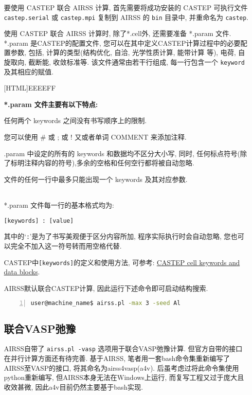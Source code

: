 \documentclass[a4paper, 10pt]{article}
\begin{document}
要使用 CASTEP 联合 AIRSS 计算, 首先需要将成功安装的 CASTEP 可执行文件 \verb|castep.serial| 或 \verb|castep.mpi| 复制到 AIRSS 的 \verb|bin| 目录中, 并重命名为 \verb|castep|.

使用 CASTEP 联合 AIRSS 计算时, 除了*.cell外, 还需要准备 *.param 文件. *.param 是CASTEP的配置文件, 您可以在其中定义CASTEP计算过程中的必要配置参数, 包括, 计算的类型(结构优化, 自洽, 光学性质计算, 能带计算 等), 电荷, 自旋取向, 截断能, 收敛标准等. 该文件通常由若干行组成, 每一行包含一个 \verb|keyword| 及其相应的赋值.

\noindent{}[HTML]{EEEEFF}{\parbox{\textwidth}{%
\noindent \textbf{*.param 文件主要有以下特点:}
\begin{maineu}
\item 任何两个 keywords 之间没有书写顺序上的限制.
\item 您可以使用 \# 或 ; 或 ! 又或者单词 COMMENT 来添加注释.
\item *.param 中设定的所有的 keywords 和数据均不区分大小写, 同时, 任何标点符号(除了标明注释内容的符号),多余的空格和任何空行都将被自动忽略.
\item 文件的任何一行中最多只能出现一个 keywords 及其对应参数.
\end{maineu}}}\\

*.param 文件每一行的基本格式均为:
\begin{lstlisting}
[keywords] : [value]
\end{lstlisting}
其中的`\verb|:|'是为了书写美观便于区分内容所加, 程序实际执行时会自动忽略, 您也可以完全不加入这一符号转而用空格代替.

CASTEP中\verb|[keywords]|的定义和使用方法, 可参考: \href{http://www.tcm.phy.cam.ac.uk/castep/documentation/WebHelp/content/modules/castep/keywords/k_main_structure.htm}{CASTEP cell keywords and data blocks}.

AIRSS默认联合CASTEP计算, 因此运行下述命令即可启动结构搜索.
\begin{lstlisting}[language={bash},numbers=left]
user@machine_name$ airss.pl -max 3 -seed Al
\end{lstlisting}

\subsection{联合VASP弛豫}
AIRSS自带了 \verb|airss.pl -vasp| 选项用于联合VASP弛豫计算. 但官方自带的接口在并行计算方面还有待完善. 基于AIRSS, 笔者用一套bash命令集重新编写了AIRSS至VASP的接口, 将其命名为airss4vasp(a4v). 后虽考虑过将此命令集使用python重新编写, 但AIRSS本身无法在Windows上运行, 而复写工程又过于庞大且收效甚微, 因此a4v目前仍然主要基于bash实现.
\end{document}
